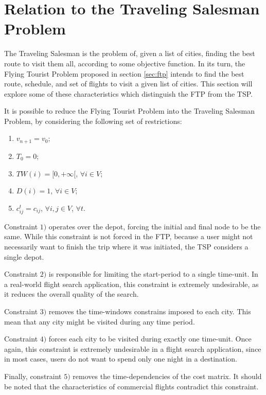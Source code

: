 \section{Relation to the Traveling Salesman Problem}
\label{sec:ftp_tsp}

The Traveling Salesman is the problem of, given a list of cities, finding the best route to visit them all, according to some objective function. In its turn, the Flying Tourist Problem proposed in section \ref{sec:ftp} intends to find the best route, schedule, and set of flights to visit a given list of cities. This section will explore some of these characteristics which distinguish the FTP from the TSP.

It is possible to reduce the Flying Tourist Problem into the Traveling Salesman Problem, by considering the following set of restrictions:

\begin{enumerate}
      \item $v_{n+1} = v_0$;
      \item $T_0 = 0$;
      \item $TW(i) = [0, +\infty[$, $\forall i \in V$;
      \item $D(i) = 1$, $\forall i \in V$;
    \item $c_{ij}^{t} = c_{ij}$, $\forall i, j \in V$, $\forall t$.
\end{enumerate}

Constraint $1)$ operates over the depot, forcing the initial and final node to be the same. While this constraint is not forced in the FTP, because a user might not necessarily want to finish the trip where it was initiated, the TSP considers a single depot. 

Constraint $2)$ is responsible for limiting the start-period to a single time-unit. In a real-world flight search application, this constraint is extremely undesirable, as it reduces the overall quality of the search.

Constraint $3)$ removes the time-windows constrains imposed to each city. This mean that any city might be visited during any time period.

Constraint $4)$ forces each city to be visited during exactly one time-unit. Once again, this constraint is extremely undesirable in a flight search application, since in most cases, users do not want to spend only one night in a destination.

Finally, constraint $5)$ removes the time-dependencies of the cost matrix. It should be noted that the characteristics of commercial flights contradict this constraint.

